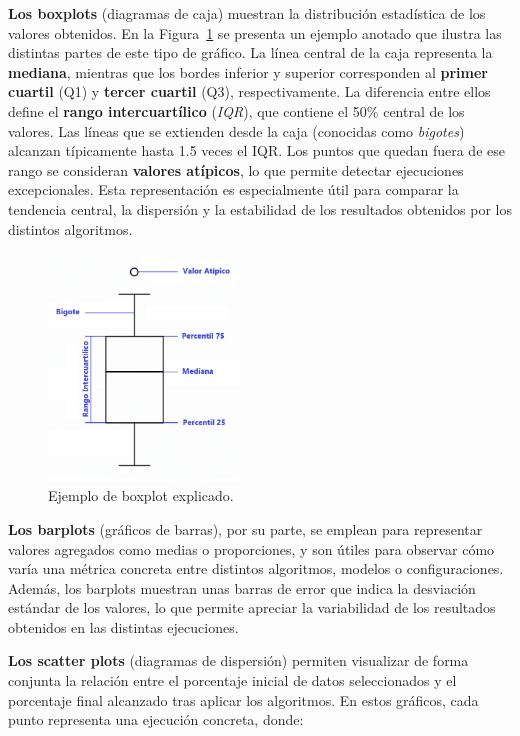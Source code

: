 \textbf{Los boxplots} (diagramas de caja) muestran la distribución estadística de los valores obtenidos.
En la Figura~\ref{fig:boxplot-explicado} se presenta un ejemplo anotado que ilustra las distintas partes de este tipo de gráfico.
La línea central de la caja representa la \textbf{mediana},
mientras que los bordes inferior y superior corresponden al \textbf{primer cuartil} (Q1) y \textbf{tercer cuartil} (Q3), respectivamente.
La diferencia entre ellos define el \textbf{rango intercuartílico} (\textit{IQR}), que contiene el 50\% central de los valores.
Las líneas que se extienden desde la caja (conocidas como \textit{bigotes}) alcanzan típicamente hasta 1.5 veces el IQR.
Los puntos que quedan fuera de ese rango se consideran \textbf{valores atípicos}, lo que permite detectar ejecuciones excepcionales.
Esta representación es especialmente útil para comparar la tendencia central, la dispersión y la estabilidad de los resultados obtenidos por los distintos algoritmos.

\begin{figure}[H]
    \centering
    \includegraphics[width=0.45\textwidth]{imagenes/boxplot-explicado}
    \caption{Ejemplo de boxplot explicado.}
    \label{fig:boxplot-explicado}
\end{figure}

\textbf{Los barplots} (gráficos de barras), por su parte, se emplean para representar valores agregados como medias o proporciones,
y son útiles para observar cómo varía una métrica concreta entre distintos algoritmos, modelos o configuraciones.
Además, los barplots muestran unas barras de error que indica la desviación estándar de los valores,
lo que permite apreciar la variabilidad de los resultados obtenidos en las distintas ejecuciones.

\textbf{Los scatter plots} (diagramas de dispersión) permiten visualizar de forma conjunta la relación entre el 
porcentaje inicial de datos seleccionados y el porcentaje final alcanzado tras aplicar los algoritmos.
En estos gráficos, cada punto representa una ejecución concreta, donde:

